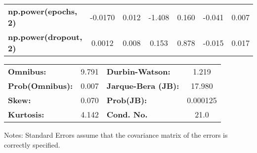 \begin{center}
\begin{tabular}{lcccccc}
\textbf{np.power(epochs, 2)}         &      -0.0170  &        0.012     &    -1.408  &         0.160        &       -0.041    &        0.007     \\
\textbf{np.power(dropout, 2)}        &       0.0012  &        0.008     &     0.153  &         0.878        &       -0.015    &        0.017     \\
\bottomrule
\end{tabular}
\begin{tabular}{lclc}
\textbf{Omnibus:}       &  9.791 & \textbf{  Durbin-Watson:     } &    1.219  \\
\textbf{Prob(Omnibus):} &  0.007 & \textbf{  Jarque-Bera (JB):  } &   17.980  \\
\textbf{Skew:}          &  0.070 & \textbf{  Prob(JB):          } & 0.000125  \\
\textbf{Kurtosis:}      &  4.142 & \textbf{  Cond. No.          } &     21.0  \\
\bottomrule
\end{tabular}
\end{center}

Notes: \newline
 [1] Standard Errors assume that the covariance matrix of the errors is correctly specified.